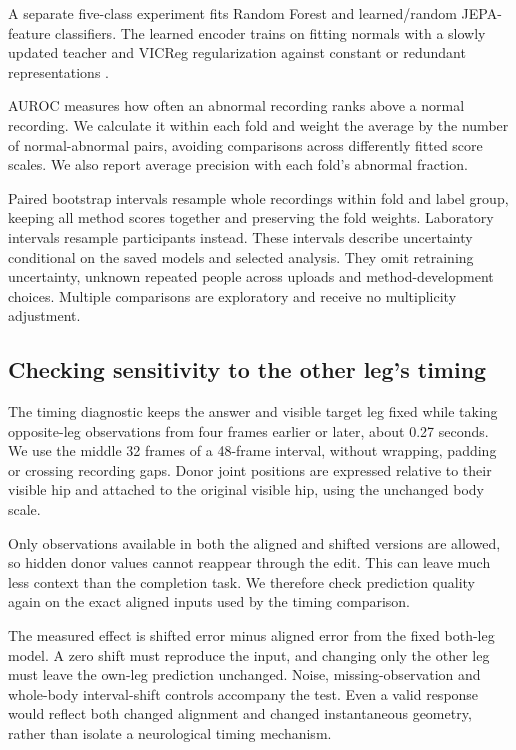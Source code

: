 \documentclass[letterpaper]{article}
\begin{document}
A separate five-class experiment fits Random Forest and learned/random JEPA-feature classifiers. The learned encoder trains on fitting normals with a slowly updated teacher and VICReg regularization against constant or redundant representations \citep{bardes2022vicreg}.

AUROC measures how often an abnormal recording ranks above a normal recording. We calculate it within each fold and weight the average by the number of normal-abnormal pairs, avoiding comparisons across differently fitted score scales. We also report average precision with each fold's abnormal fraction.

Paired bootstrap intervals resample whole recordings within fold and label group, keeping all method scores together and preserving the fold weights. Laboratory intervals resample participants instead. These intervals describe uncertainty conditional on the saved models and selected analysis. They omit retraining uncertainty, unknown repeated people across uploads and method-development choices. Multiple comparisons are exploratory and receive no multiplicity adjustment.

\subsection{Checking sensitivity to the other leg's timing}

The timing diagnostic keeps the answer and visible target leg fixed while taking opposite-leg observations from four frames earlier or later, about 0.27 seconds. We use the middle 32 frames of a 48-frame interval, without wrapping, padding or crossing recording gaps. Donor joint positions are expressed relative to their visible hip and attached to the original visible hip, using the unchanged body scale.

Only observations available in both the aligned and shifted versions are allowed, so hidden donor values cannot reappear through the edit. This can leave much less context than the completion task. We therefore check prediction quality again on the exact aligned inputs used by the timing comparison.

The measured effect is shifted error minus aligned error from the fixed both-leg model. A zero shift must reproduce the input, and changing only the other leg must leave the own-leg prediction unchanged. Noise, missing-observation and whole-body interval-shift controls accompany the test. Even a valid response would reflect both changed alignment and changed instantaneous geometry, rather than isolate a neurological timing mechanism.
\end{document}
